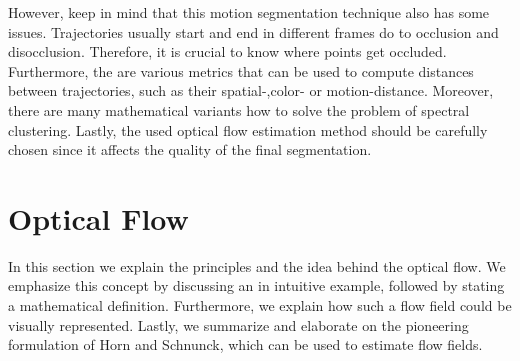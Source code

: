 However, keep in mind that this motion segmentation technique also has some issues. Trajectories usually start and end in different frames do to occlusion and disocclusion. Therefore, it is crucial to know where points get occluded. Furthermore, the are various metrics that can be used to compute distances between trajectories, such as their spatial-,color- or motion-distance. Moreover, there are many mathematical variants how to solve the problem of spectral clustering. Lastly, the used optical flow estimation method should be carefully chosen since it affects the quality of the final segmentation.

\section{Optical Flow}
\label{sec:optical_flow}
In this section we explain the principles and the idea behind the optical flow. We emphasize this concept by discussing an in intuitive example, followed by stating a mathematical definition. Furthermore, we explain how such a flow field could be visually represented. Lastly, we summarize and elaborate on the pioneering formulation of Horn and Schnunck, which can be used to estimate flow fields.

